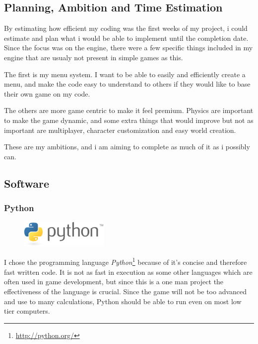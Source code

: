 \documentclass[a4paper,12pt]{article}
\begin{document}
\subsection{Planning, Ambition and Time Estimation}

By estimating how efficient my coding was the first weeks of my project, i could estimate and plan what i would be able to implement until the completion date.
Since the focus was on the engine, there were a few specific things included in my engine that are usualy not present in simple games as this.

The first is my menu system.
I want to be able to easily and efficiently create a menu, and make the code easy to understand to others if they would like to base their own game on my code.

The others are more game centric to make it feel premium.
Physics are important to make the game dynamic, and some extra things that would improve but not as important are multiplayer, character customization and easy world creation.

These are my ambitions, and i am aiming to complete as much of it as i possibly can.


\subsection{Software}

\subsubsection{Python}
\begin{figure}
    \vspace{-30pt}
    \begin{center}
    \includegraphics[width=0.38\textwidth]{img/python-logo.eps}
    \end{center}
    \vspace{-40pt}
\end{figure}
I chose the programming language \emph{Python}\footnote{\url{http://python.org/}} because of it's concise and therefore fast written code. 
It is not as fast in execution as some other languages which are often used in game development, but since this is a one man project the effectiveness of the language is crucial.
Since the game will not be too advanced and use to many calculations, Python should be able to run even on most low tier computers.
\end{document}
